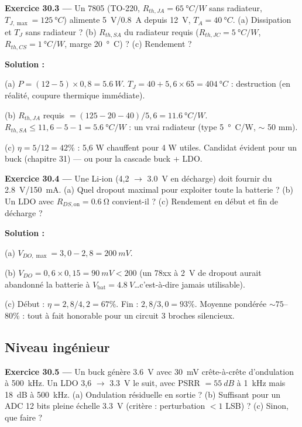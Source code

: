 \documentclass[12pt,a4paper,twoside]{book}
\begin{document}
\textbf{Exercice 30.3 ---} Un 7805 (TO-220, $R_{th,JA} = \SI{65}{°C/W}$ sans radiateur, $T_{J,\max} = \SI{125}{°C}$) alimente \SI{5}{V}/\SI{0.8}{A} depuis \SI{12}{V}, $T_A = \SI{40}{°C}$. (a) Dissipation et $T_J$ sans radiateur ? (b) $R_{th,SA}$ du radiateur requis ($R_{th,JC} = \SI{5}{°C/W}$, $R_{th,CS} = \SI{1}{°C/W}$, marge \SI{20}{°C}) ? (c) Rendement ?

\begin{pratique}
\textbf{Solution :}

(a) $P = (12-5)\times0{,}8 = \SI{5.6}{W}$. $T_J = 40 + 5{,}6\times65 = \SI{404}{°C}$ : destruction (en réalité, coupure thermique immédiate).

(b) $R_{th,JA}$ requis $= (125-20-40)/5{,}6 = \SI{11.6}{°C/W}$. $R_{th,SA} \leq 11{,}6 - 5 - 1 = \SI{5.6}{°C/W}$ : un vrai radiateur (type \SI{5}{°C/W}, $\sim$ 50 mm).

(c) $\eta = 5/12 = 42\%$ : 5,6 W chauffent pour 4 W utiles. Candidat évident pour un buck (chapitre 31) --- ou pour la cascade buck + LDO.
\end{pratique}

\textbf{Exercice 30.4 ---} Une Li-ion (4,2 $\to$ \SI{3.0}{V} en décharge) doit fournir du \SI{2.8}{V}/\SI{150}{mA}. (a) Quel dropout maximal pour exploiter toute la batterie ? (b) Un LDO avec $R_{DS,\text{on}} = \SI{0.6}{\ohm}$ convient-il ? (c) Rendement en début et fin de décharge ?

\begin{pratique}
\textbf{Solution :}

(a) $V_{DO,\max} = 3{,}0 - 2{,}8 = \SI{200}{mV}$.

(b) $V_{DO} = 0{,}6\times0{,}15 = \SI{90}{mV} < 200$ \checkmark{} (un 78xx à \SI{2}{V} de dropout aurait abandonné la batterie à $V_{\text{bat}} = \SI{4.8}{V}$\ldots c'est-à-dire jamais utilisable).

(c) Début : $\eta = 2{,}8/4{,}2 = 67\%$. Fin : $2{,}8/3{,}0 = 93\%$. Moyenne pondérée $\sim 75$--$80\%$ : tout à fait honorable pour un circuit 3 broches silencieux.
\end{pratique}

\subsection*{Niveau ingénieur}

\textbf{Exercice 30.5 ---} Un buck génère \SI{3.6}{V} avec \SI{30}{mV} crête-à-crête d'ondulation à \SI{500}{kHz}. Un LDO 3,6 $\to$ \SI{3.3}{V} le suit, avec PSRR $= \SI{55}{dB}$ à \SI{1}{kHz} mais \SI{18}{dB} à \SI{500}{kHz}. (a) Ondulation résiduelle en sortie ? (b) Suffisant pour un ADC 12 bits pleine échelle \SI{3.3}{V} (critère : perturbation $< 1$ LSB) ? (c) Sinon, que faire ?
\end{document}
